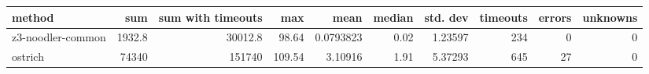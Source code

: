 \begin{tabular}{lrrrrrrrrr}
\hline
 method            &     sum &   sum with timeouts &    max &      mean &   median &   std. dev &   timeouts &   errors &   unknowns \\
\hline
 z3-noodler-common &  1932.8 &             30012.8 &  98.64 & 0.0793823 &     0.02 &    1.23597 &        234 &        0 &          0 \\
 ostrich           & 74340   &            151740   & 109.54 & 3.10916   &     1.91 &    5.37293 &        645 &       27 &          0 \\
\hline
\end{tabular}
